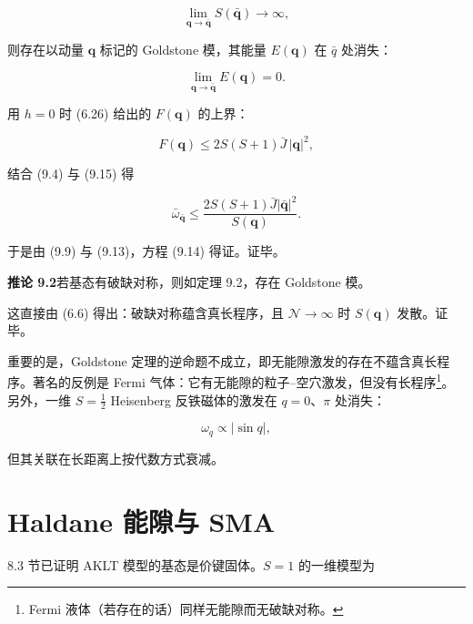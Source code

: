 \begin{equation*}
\lim _ {\mathbf {q} \to \bar {\mathbf {q}}} S ( \bar {\mathbf {q}} ) \to \infty ,
\tag{9.13}
\end{equation*}

则存在以动量 $\mathbf{q}$ 标记的 Goldstone 模，其能量 $E(\mathbf{q})$ 在 $\bar{q}$ 处消失：

\begin{equation*}
\lim _ {\mathbf {q} \to \bar {\mathbf {q}}} E ( \mathbf {q} ) = 0.
\tag{9.14}
\end{equation*}
\medskip

用 $h = 0$ 时 (6.26) 给出的 $F(\mathbf{q})$ 的上界：

\begin{equation*}
F ( \mathbf {q} ) \leq 2 S ( S + 1 ) \bar {J} \, | \mathbf {q} | ^ {2} ,
\tag{9.15}
\end{equation*}

结合 (9.4) 与 (9.15) 得

\begin{equation*}
\bar {\omega} _ {\bar {\mathbf {q}}} \leq \frac {2 S ( S + 1 ) \bar {J} | \bar {\mathbf {q}} | ^ {2}}{S ( \mathbf {q} )}.
\tag{9.16}
\end{equation*}

于是由 (9.9) 与 (9.13)，方程 (9.14) 得证。证毕。

\medskip
\noindent\textbf{推论 9.2}\quad 若基态有破缺对称，则如定理 9.2，存在 Goldstone 模。
\medskip

这直接由 (6.6) 得出：破缺对称蕴含真长程序，且 $\mathcal{N} \to \infty$ 时 $S(\mathbf{q})$ 发散。证毕。

重要的是，Goldstone 定理的逆命题不成立，即无能隙激发的存在不蕴含真长程序。著名的反例是 Fermi 气体：它有无能隙的粒子--空穴激发，但没有长程序\footnote{Fermi 液体（若存在的话）同样无能隙而无破缺对称。}。另外，一维 $S = \frac{1}{2}$ Heisenberg 反铁磁体的激发在 $q = 0$、$\pi$ 处消失：

\begin{equation*}
\omega_ {q} \propto | \sin q | ,
\tag{9.17}
\end{equation*}

但其关联在长距离上按代数方式衰减。

\section{Haldane 能隙与 SMA}

8.3 节已证明 AKLT 模型的基态是价键固体。$S = 1$ 的一维模型为

